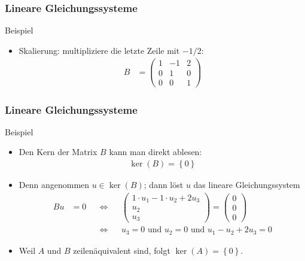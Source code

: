\documentclass{beamer}
\newcommand\cbc[1]{\left\{{#1}\right\}}
\renewcommand{\ae}{\"a}
\renewcommand{\oe}{\"o}
\newcommand{\mytitle}{Lineare Gleichungssysteme}
\begin{document}
\begin{frame}\frametitle{\mytitle}
	\begin{block}{Beispiel}
	\begin{itemize}
		\item \alert{Skalierung:} multipliziere die letzte Zeile mit $-1/2$:
\begin{align*}
	B&=\begin{pmatrix} 1&-1&2\\0&1&0\\0&0&1 \end{pmatrix}
		\end{align*}
	\end{itemize}
	\end{block}
\end{frame}

\begin{frame}\frametitle{\mytitle}
	\begin{block}{Beispiel}
	\begin{itemize}
	\item Den Kern der Matrix $B$ kann man direkt ablesen:
		\begin{align*}
			\ker(B)=\cbc 0
		\end{align*}
	\item Denn angenommen $u\in\ker(B)$; dann l\oe st $u$ das lineare Gleichungssystem
		\begin{align*}
			Bu&=0&&\Leftrightarrow&
			  &\begin{pmatrix} 1\cdot u_1-1\cdot u_2+2u_3\\ u_2\\ u_3
			\end{pmatrix}=\begin{pmatrix} 0\\0\\0 \end{pmatrix}\\
			  &&&\Leftrightarrow&& u_3=0\mbox{ und }u_2=0\mbox{ und }u_1-u_2+2u_3=0
		\end{align*}
	\item Weil $A$ und $B$ zeilen\ae quivalent sind, folgt $\ker(A)=\cbc 0$.
	\end{itemize}
	\end{block}
\end{frame}
\end{document}
